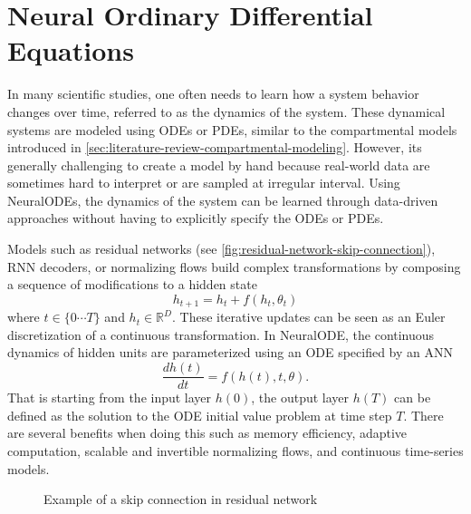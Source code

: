 \section{Neural Ordinary Differential Equations}

In many scientific studies, one often needs to learn how a system behavior changes over time, referred to as the dynamics of the system.
These dynamical systems are modeled using \glspl{ODE} or \glspl{PDE}, similar to the compartmental models introduced in \autoref{sec:literature-review-compartmental-modeling}.
However, its generally challenging to create a model by hand because real-world data are sometimes hard to interpret or are sampled at irregular interval.
Using \glspl{NeuralODE}, the dynamics of the system can be learned through data-driven approaches without having to explicitly specify the \glspl{ODE} or \glspl{PDE}.

Models such as residual networks (see \autoref{fig:residual-network-skip-connection}), \gls{RNN} decoders, or normalizing flows build complex transformations by composing a sequence of modifications to a hidden state \cite{chenNeuralOrdinaryDifferential2019}
\begin{equation*}
    h_{t+1} = h_t + f(h_t, \theta_t)
\end{equation*}
where $t \in \{0 \cdots T\}$ and $h_t \in \mathbb{R}^D$.
These iterative updates can be seen as an Euler discretization of a continuous transformation.
In \gls{NeuralODE}, the continuous dynamics of hidden units are parameterized using an \gls{ODE} specified by an \gls{ANN}
\begin{equation*}
    \frac{dh(t)}{dt} = f(h(t), t, \theta).
\end{equation*}
That is starting from the input layer $h(0)$, the output layer $h(T)$ can be defined as the solution to the \gls{ODE} initial value problem at time step $T$.
There are several benefits when doing this such as memory efficiency, adaptive computation, scalable and invertible normalizing flows, and continuous time-series models.

\begin{figure}
    \centering
    \caption{Example of a skip connection in residual network}
    \label{fig:residual-network-skip-connection}
\end{figure}

